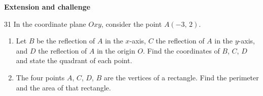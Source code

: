 \documentclass[11pt]{article}
\newcommand{\dividerbar}[1]{\par\vspace{0.6em}\noindent
  \begin{tcolorbox}[enhanced,frame hidden,interior hidden,borderline west={5pt}{0pt}{ProbBlue},
    colback=white,left=12pt,right=12pt,top=5pt,bottom=5pt,arc=4pt]
  {\large\bfseries\color{ProbBlue} #1}\end{tcolorbox}\vspace{0.4em}}
\begin{document}
\clearpage
\dividerbar{Extension and challenge}

\begin{probbox}{31}{\relax}
In the coordinate plane $Oxy$, consider the point $A(-3,\,2)$.
\begin{enumerate}[label=\alph*),leftmargin=1.6em,itemsep=0pt,topsep=2pt]
  \item Let $B$ be the reflection of $A$ in the $x$-axis, $C$ the reflection of $A$ in the $y$-axis, and $D$ the reflection of $A$ in the origin $O$. Find the coordinates of $B$, $C$, $D$ and state the quadrant of each point.
  \item The four points $A$, $C$, $D$, $B$ are the vertices of a rectangle. Find the perimeter and the area of that rectangle.
\end{enumerate}
\end{probbox}
\end{document}
